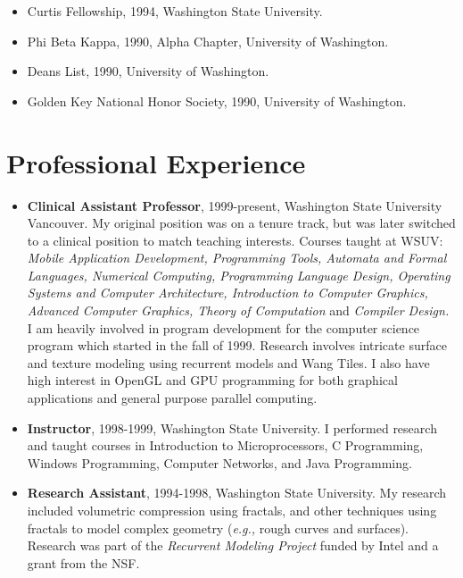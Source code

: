 \documentclass[10pt]{article}
\begin{document}
\begin{itemize}
\item Curtis Fellowship, 1994, Washington State University.
\item Phi Beta Kappa, 1990, Alpha Chapter, University of Washington.
\item Deans List, 1990, University of Washington.
\item Golden Key National Honor Society, 1990, University of Washington.
\end{itemize}


\section*{Professional Experience}

\begin{itemize}
\item {\bf Clinical Assistant Professor}, 1999-present,
Washington State University Vancouver.
My original position was on a tenure track, but was later switched
to a clinical position to match teaching interests.
Courses taught at WSUV:
{\em Mobile Application Development, Programming Tools, 
Automata and Formal Languages, 
Numerical Computing,
Programming Language Design,
Operating Systems and Computer Architecture, 
Introduction to Computer Graphics,
Advanced Computer Graphics, Theory of Computation} and {\em Compiler Design.}
I am heavily involved in program development for 
the computer science program which started in the fall of 1999.
Research involves intricate surface and texture
modeling using recurrent models and Wang Tiles.
I also have high interest in OpenGL and GPU programming for both
graphical applications and general purpose parallel computing.

\item {\bf Instructor}, 1998-1999,
Washington State University. I performed research and taught
courses in Introduction to Microprocessors, C Programming,
Windows Programming, Computer Networks, and Java Programming.

\item {\bf Research Assistant}, 1994-1998,
Washington State University.
My research included volumetric compression using fractals,
and other techniques using fractals to model complex geometry
({\it e.g.,} rough curves and surfaces). Research was part of the
{\em Recurrent Modeling Project} funded by Intel and a grant
from the NSF.


\end{itemize}
\end{document}
